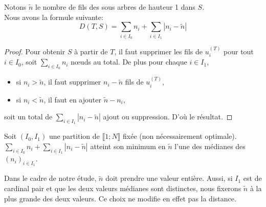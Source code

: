 \begin{lem}
  \label{lem1}
  Notons $\tilde{n}$ le nombre de fils des sous arbres de hauteur 1
  dans $S$.\\
  Nous avons la formule suivante:
  $$D(T,S) = \sum_{i \in I_{0}} n_{i} + \sum_{i \in I_{1}} |n_{i} - \tilde{n}|$$
  
  \begin{proof}
    Pour obtenir $S$ à partir de $T$, il faut supprimer les fils de
    $u_{i}^{(T)}$ pour tout $i \in I_{0}$, soit $\sum_{i \in I_{0}} n_{i}$
    nœuds au total. De plus pour chaque $i \in I_{1}$,
    \begin{itemize}
    \item si $n_{i} > \tilde{n}$, il faut supprimer
      $n_{i} - \tilde{n}$ fils de $u_{i}^{(T)}$,
    \item si $n_{i} < \tilde{n}$, il faut en ajouter
      $\tilde{n} - n_{i}$, 
    \end{itemize}
    soit un total de $\sum_{i \in I_{1}} |n_{i} - \tilde{n}|$ ajout
    ou suppression. D'où le résultat.
  \end{proof}
\end{lem}

\begin{lem}
  \label{lem2}
  Soit $(I_{0}, I_{1})$ une partition de $\llbracket 1;N \rrbracket$
  fixée (non nécessairement optimale).\\
  $\sum_{i \in I_{0}} n_{i} + \sum_{i \in I_{1}} |n_{i} - \tilde{n}|$
  atteint son minimum en $\tilde{n}$ l'une des médianes des
  $(n_{i})_{i \in I_{1}}$.
\end{lem}

\begin{rem}
  \label{rem2}
  Dans le cadre de notre étude, $\tilde{n}$ doit prendre une valeur
  entière. Aussi, si $I_{1}$ est de cardinal pair et que les deux
  valeurs médianes sont distinctes, nous fixerons $\tilde{n}$ à la
  plus grande des deux valeurs. Ce choix ne modifie en effet pas la
  distance.
\end{rem}

